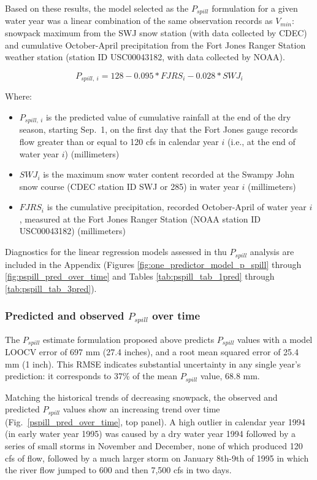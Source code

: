 \documentclass[hess, manuscript]{copernicus}
\providecommand{\tightlist}{%
  \setlength{\itemsep}{0pt}\setlength{\parskip}{0pt}}
\begin{document}
Based on these results, the model selected as the $P_{spill}$
formulation for a given water year was a linear combination of the same
observation records as $V_{min}$: snowpack maximum from the SWJ snow
station (with data collected by CDEC) and cumulative October-April
precipitation from the Fort Jones Ranger Station weather station
(station ID USC00043182, with data collected by NOAA).

\begin{equation}
P_{spill,~i} = 128 -0.095 * FJRS_{i} - 0.028* SWJ_{i}
\end{equation}

Where:

\begin{itemize}
\tightlist
\item
  $P_{spill,~i}$ is the predicted value of cumulative rainfall at the
  end of the dry season, starting Sep.~1, on the first day that the Fort
  Jones gauge records flow greater than or equal to 120 cfs in calendar
  year $i$ (i.e., at the end of water year $i$) (millimeters)
\item
  $SWJ_{i}$ is the maximum snow water content recorded at the Swampy
  John snow course (CDEC station ID SWJ or 285) in water year $i$
  (millimeters)
\item
  $FJRS_{i}$ is the cumulative precipitation, recorded October-April
  of water year $i$, measured at the Fort Jones Ranger Station (NOAA
  station ID USC00043182) (millimeters)
\end{itemize}

Diagnostics for the linear regression models assessed in thu
$P_{spill}$ analysis are included in the Appendix (Figures
\ref{fig:one_predictor_model_p_spill} through
\ref{fig:pspill_pred_over_time} and Tables \ref{tab:pspill_tab_1pred}
through \ref{tab:pspill_tab_3pred}).

\subsubsection{\texorpdfstring{Predicted and observed $P_{spill}$ over
time}{Predicted and observed P\_\{spill\} over time}}

The $P_{spill}$ estimate formulation proposed above predicts
$P_{spill}$ values with a model LOOCV error of 697 mm (27.4 inches),
and a root mean squared error of 25.4 mm (1 inch). This RMSE indicates
substantial uncertainty in any single year's prediction: it corresponds
to 37\% of the mean $P_{spill}$ value, 68.8 mm.

Matching the historical trends of decreasing snowpack, the observed and
predicted $P_{spill}$ values show an increasing trend over time
(Fig.~\ref{pspill_pred_over_time}, top panel). A high outlier in
calendar year 1994 (in early water year 1995) was caused by a dry water
year 1994 followed by a series of small storms in November and December,
none of which produced 120 cfs of flow, followed by a much larger storm
on January 8th-9th of 1995 in which the river flow jumped to 600 and
then 7,500 cfs in two days.
\end{document}
